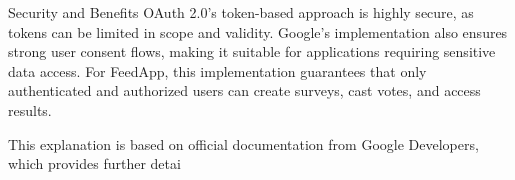 Security and Benefits
OAuth 2.0's token-based approach is highly secure, as tokens can be limited in scope and validity. Google’s implementation also ensures strong user consent flows, making it suitable for applications requiring sensitive data access. For FeedApp, this implementation guarantees that only authenticated and authorized users can create surveys, cast votes, and access results.

This explanation is based on official documentation from Google Developers, which provides further detai


